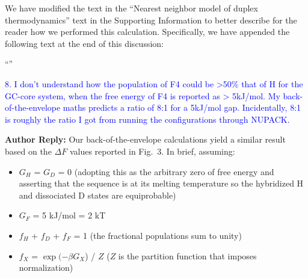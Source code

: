 \documentclass[11pt,a4paper]{letter} %
\newcommand*{\rood}[1]{{\color{red}{#1}}}
\newcommand*{\noteg}[1]{\textcolor{green}{[[#1]]}}		%
\begin{document}
We have modified the text in the ``Nearest neighbor model of duplex thermodynamics'' text in the Supporting Information to better describe for the reader how we performed this calculation. Specifically, we have appended the following text at the end of this discussion:

``\rood{In applying the NN models to each macrostate, we made the simplifying assumption that the ensemble of microstates constituting each macrostate could be represented by a single pattern of Watson-Crick base pairing that are schematically illustrated in Fig.~2a.}''







\textcolor{blue}{8. I don't understand how the population of F4 could be >50\% that of H for the GC-core system, when the free energy of F4 is reported as > 5kJ/mol. My back-of-the-envelope maths predicts a ratio of 8:1 for a 5kJ/mol gap. Incidentally, 8:1 is roughly the ratio I got from running the configurations through NUPACK.}

\textbf{Author Reply:}   Our back-of-the-envelope calculations yield a similar result based on the $\Delta F$ values reported in Fig.~3. In brief, assuming:

\begin{itemize}
\item $G_H$ = $G_D$ = 0 (adopting this as the arbitrary zero of free energy and asserting that the sequence is at its melting temperature so the hybridized H and dissociated D states are equiprobable)
\item $G_F$ = 5 kJ/mol = 2 kT
\item $f_H$ + $f_D$ + $f_F$ = 1 (the fractional populations sum to unity)
\item $f_X$ = $\exp (-\beta G_X$) / $Z$ ($Z$ is the partition function that imposes normalization)
\end{itemize}
\end{document}
